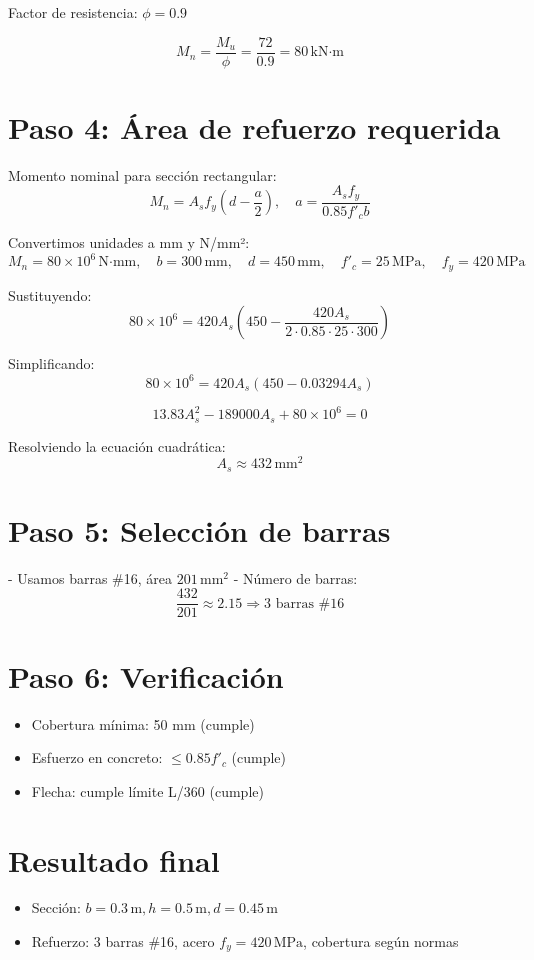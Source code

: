\documentclass[12pt]{article}
\begin{document}
Factor de resistencia: $\phi = 0.9$

\[
M_n = \frac{M_u}{\phi} = \frac{72}{0.9} = 80 \, \text{kN·m}
\]

\section*{Paso 4: Área de refuerzo requerida}

Momento nominal para sección rectangular:
\[
M_n = A_s f_y \left(d - \frac{a}{2}\right), \quad a = \frac{A_s f_y}{0.85 f'_c b}
\]

Convertimos unidades a mm y N/mm²:
\[
M_n = 80 \times 10^6 \, \text{N·mm}, \quad b = 300\,\text{mm}, \quad d = 450\,\text{mm}, 
\quad f'_c = 25 \, \text{MPa}, \quad f_y = 420 \, \text{MPa}
\]

Sustituyendo:
\[
80 \times 10^6 = 420 A_s \left(450 - \frac{420 A_s}{2 \cdot 0.85 \cdot 25 \cdot 300}\right)
\]

Simplificando:
\[
80 \times 10^6 = 420 A_s \left(450 - 0.03294 A_s\right) 
\]

\[
13.83 A_s^2 - 189000 A_s + 80 \times 10^6 = 0
\]

Resolviendo la ecuación cuadrática:
\[
A_s \approx 432 \, \text{mm}^2
\]

\section*{Paso 5: Selección de barras}

- Usamos barras \#16, área $201 \, \text{mm}^2$  
- Número de barras:
\[
\frac{432}{201} \approx 2.15 \Rightarrow 3 \text{ barras \#16}
\]

\section*{Paso 6: Verificación}

\begin{itemize}
    \item Cobertura mínima: 50 mm (cumple)
    \item Esfuerzo en concreto: $\le 0.85 f'_c$ (cumple)
    \item Flecha: cumple límite L/360 (cumple)
\end{itemize}

\section*{Resultado final}

\begin{itemize}
    \item Sección: $b = 0.3\,\text{m}, h = 0.5\,\text{m}, d = 0.45\,\text{m}$
    \item Refuerzo: 3 barras \#16, acero $f_y = 420 \, \text{MPa}$, cobertura según normas
\end{itemize}
\end{document}
